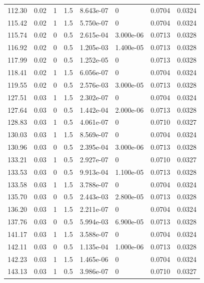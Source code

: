 \documentclass[preview]{standalone}
\begin{document}
{{{\begin{tabular}{L{1.2cm}C{1.2cm} C{0.3cm}C{0.5cm} C{1.4cm}C{1.4cm} C{1.4cm}C{1.4cm}}
  112.30  &  0.02  & 1     & 1.5 &  8.643e-07  & 0  & 0.0704 &  0.0324   \\ 
  115.42  &  0.02  & 1     & 1.5 &  5.750e-07  & 0  & 0.0704 &  0.0324   \\ 
  115.74  &  0.02  & 0     & 0.5 &  2.615e-04  & 3.000e-06  & 0.0713 &  0.0328   \\ 
  116.92  &  0.02  & 0     & 0.5 &  1.205e-03  & 1.400e-05  & 0.0713 &  0.0328   \\ 
  117.99  &  0.02  & 0     & 0.5 &  1.252e-05  & 0  & 0.0713 &  0.0328   \\ 
  118.41  &  0.02  & 1     & 1.5 &  6.056e-07  & 0  & 0.0704 &  0.0324   \\ 
  119.55  &  0.02  & 0     & 0.5 &  2.576e-03  & 3.000e-05  & 0.0713 &  0.0328   \\ 
  127.51  &  0.03  & 1     & 1.5 &  2.302e-07  & 0  & 0.0704 &  0.0324   \\ 
  127.64  &  0.03  & 0     & 0.5 &  1.442e-04  & 2.000e-06  & 0.0713 &  0.0328   \\ 
  128.83  &  0.03  & 1     & 0.5 &  4.061e-07  & 0  & 0.0710 &  0.0327   \\ 
  130.03  &  0.03  & 1     & 1.5 &  8.569e-07  & 0  & 0.0704 &  0.0324   \\ 
  130.96  &  0.03  & 0     & 0.5 &  2.395e-04  & 3.000e-06  & 0.0713 &  0.0328   \\ 
  133.21  &  0.03  & 1     & 0.5 &  2.927e-07  & 0  & 0.0710 &  0.0327   \\ 
  133.53  &  0.03  & 0     & 0.5 &  9.913e-04  & 1.100e-05  & 0.0713 &  0.0328   \\ 
  133.58  &  0.03  & 1     & 1.5 &  3.788e-07  & 0  & 0.0704 &  0.0324   \\ 
  135.70  &  0.03  & 0     & 0.5 &  2.443e-03  & 2.800e-05  & 0.0713 &  0.0328   \\ 
  136.20  &  0.03  & 1     & 1.5 &  2.211e-07  & 0  & 0.0704 &  0.0324   \\ 
  137.76  &  0.03  & 0     & 0.5 &  5.994e-03  & 6.900e-05  & 0.0713 &  0.0328   \\ 
  141.17  &  0.03  & 1     & 1.5 &  3.588e-07  & 0  & 0.0704 &  0.0324   \\ 
  142.11  &  0.03  & 0     & 0.5 &  1.135e-04  & 1.000e-06  & 0.0713 &  0.0328   \\ 
  142.23  &  0.03  & 1     & 1.5 &  1.465e-06  & 0  & 0.0704 &  0.0324   \\ 
  143.13  &  0.03  & 1     & 0.5 &  3.986e-07  & 0  & 0.0710 &  0.0327   \\ 

\end{tabular}}}}
\end{document}
